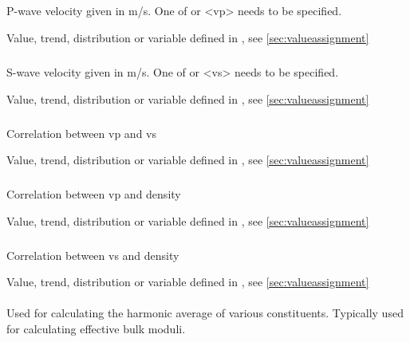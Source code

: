 {\subparagraph{}
 \slist
   \item \Description P-wave velocity given in m/s. One of  or <vp> needs to be specified.
   \item \Argument Value, trend, distribution or variable defined in , see \autoref{sec:valueassignment}
   \item \Default 
 \elist

\subparagraph{}
 \slist
   \item \Description S-wave velocity given in m/s. One of  or <vs> needs to be specified.
   \item \Argument Value, trend, distribution or variable defined in , see \autoref{sec:valueassignment}
   \item \Default 
 \elist

\subparagraph{}
 \slist
   \item \Description Correlation between vp and vs
   \item \Argument Value, trend, distribution or variable defined in , see \autoref{sec:valueassignment}
   \item {}
 \elist

\subparagraph{}
 \slist
   \item \Description Correlation between vp and density
   \item \Argument Value, trend, distribution or variable defined in , see \autoref{sec:valueassignment}
   \item {}
 \elist

\subparagraph{}
 \slist
   \item \Description Correlation between vs and density
   \item \Argument Value, trend, distribution or variable defined in , see \autoref{sec:valueassignment}
   \item {}
 \elist

\paragraph{}
 \slist
   \item \Description Used for calculating the harmonic average of various constituents. Typically used for calculating effective bulk moduli. 
   \item \Argument
   \item \Default 
 \elist

}
